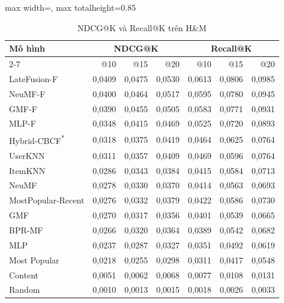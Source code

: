 \begin{table}[H]
    \centering\small\setlength{\tabcolsep}{4pt}
    \caption{NDCG@K và Recall@K trên H\&M}
    \label{tab:v2k1}
    \begin{adjustbox}{max width=\textwidth, max totalheight=0.85\textheight}
    \begin{tabular}{|l|r|r|r|r|r|r|}
        \hline
        \multirow{2}{*}{Mô hình} & \multicolumn{3}{c|}{NDCG@K} & \multicolumn{3}{c|}{Recall@K} \\ \cline{2-7}
         & @10 & @15 & @20 & @10 & @15 & @20 \\ \hline
        LateFusion-F & 0{,}0409 & 0{,}0475 & 0{,}0530 & 0{,}0613 & 0{,}0806 & 0{,}0985 \\ \hline
        NeuMF-F & 0{,}0400 & 0{,}0464 & 0{,}0517 & 0{,}0595 & 0{,}0780 & 0{,}0945 \\ \hline
        GMF-F & 0{,}0390 & 0{,}0455 & 0{,}0505 & 0{,}0583 & 0{,}0771 & 0{,}0931 \\ \hline
        MLP-F & 0{,}0348 & 0{,}0415 & 0{,}0469 & 0{,}0525 & 0{,}0720 & 0{,}0893 \\ \hline
        Hybrid-CBCF\textsuperscript{*} & 0{,}0318 & 0{,}0375 & 0{,}0419 & 0{,}0464 & 0{,}0625 & 0{,}0764 \\ \hline
        UserKNN & 0{,}0311 & 0{,}0357 & 0{,}0409 & 0{,}0469 & 0{,}0596 & 0{,}0764 \\ \hline
        ItemKNN & 0{,}0286 & 0{,}0343 & 0{,}0384 & 0{,}0415 & 0{,}0584 & 0{,}0713 \\ \hline
        NeuMF & 0{,}0278 & 0{,}0330 & 0{,}0370 & 0{,}0414 & 0{,}0563 & 0{,}0693 \\ \hline
        MostPopular-Recent & 0{,}0276 & 0{,}0332 & 0{,}0379 & 0{,}0422 & 0{,}0586 & 0{,}0730 \\ \hline
        GMF & 0{,}0270 & 0{,}0317 & 0{,}0356 & 0{,}0401 & 0{,}0539 & 0{,}0665 \\ \hline
        BPR-MF & 0{,}0266 & 0{,}0320 & 0{,}0364 & 0{,}0389 & 0{,}0542 & 0{,}0682 \\ \hline
        MLP & 0{,}0237 & 0{,}0287 & 0{,}0327 & 0{,}0351 & 0{,}0492 & 0{,}0619 \\ \hline
        Most Popular & 0{,}0218 & 0{,}0255 & 0{,}0298 & 0{,}0311 & 0{,}0417 & 0{,}0548 \\ \hline
        Content & 0{,}0051 & 0{,}0062 & 0{,}0068 & 0{,}0077 & 0{,}0108 & 0{,}0131 \\ \hline
        Random & 0{,}0010 & 0{,}0013 & 0{,}0015 & 0{,}0018 & 0{,}0026 & 0{,}0033 \\ \hline
    \end{tabular}
    \end{adjustbox}
\end{table}

